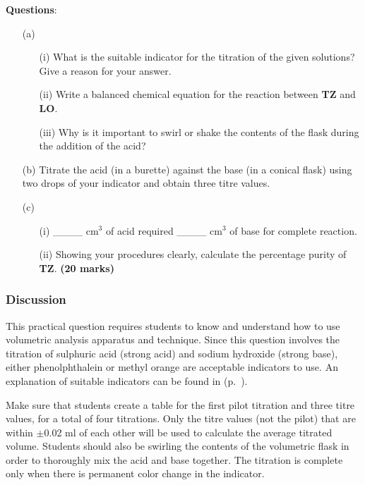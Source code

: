 \textbf{Questions}:\\
\begin{enumerate}
\item[(a)]
\begin{enumerate}
\item[(i)] What is the suitable indicator for the titration of the given solutions?\\
Give a reason for your answer.
\item[(ii)] Write a balanced chemical equation for the reaction between \textbf{TZ} and \textbf{LO}.
\item[(iii)] Why is it important to swirl or shake the contents of the flask during the addition of the acid?\\
\end{enumerate}

\item[(b)] Titrate the acid (in a burette) against the base (in a conical flask) using two drops of your indicator and obtain three titre values.\\

\item[(c)] 
\begin{enumerate}
\item[(i)] \_\_\_\_ cm$^3$ of acid required \_\_\_\_ cm$^3$ of base for complete reaction.
\item[(ii)] Showing your procedures clearly, calculate the percentage purity of \textbf{TZ}. \hfill \textbf{(20 marks)}
\end{enumerate}
\end{enumerate}


\subsubsection{Discussion}
This practical question requires students to know and understand how to use volumetric analysis apparatus and technique. Since this question involves the titration of sulphuric acid (strong acid) and sodium hydroxide (strong base), either phenolphthalein or methyl orange are acceptable indicators to use. An explanation of suitable indicators can be found in  (p.~\pageref{sss:acid-baseind}).

Make sure that students create a table for the first pilot titration and three titre values, for a total of four titrations. Only the titre values (not the pilot) that are within $\pm$0.02 ml of each other will be used to calculate the average titrated volume. Students should also be swirling the contents of the volumetric flask in order to thoroughly mix the acid and base together. The titration is complete only when there is permanent color change in the indicator.

